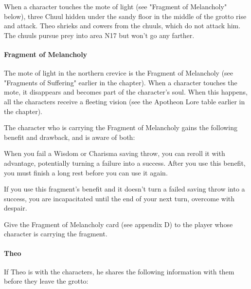 \documentclass[10pt,a4paper,twoside,bg=print,twocolumn,openany,nodeprecatedcode]{dndbook}
\begin{document}
When a character touches the mote of light (see "Fragment of Melancholy" below), three Chuul hidden under the sandy floor in the middle of the grotto rise and attack. Theo shrieks and cowers from the chuuls, which do not attack him. The chuuls pursue prey into area N17 but won't go any farther.

\paragraph{Fragment of Melancholy}
The mote of light in the northern crevice is the Fragment of Melancholy (see "Fragments of Suffering" earlier in the chapter). When a character touches the mote, it disappears and becomes part of the character's soul. When this happens, all the characters receive a fleeting vision (see the Apotheon Lore table earlier in the chapter).

The character who is carrying the Fragment of Melancholy gains the following benefit and drawback, and is aware of both:

\begin{DndComment}{}

\begin{description}[nolistsep]
\item[Benefit.]
When you fail a Wisdom or Charisma saving throw, you can reroll it with advantage, potentially turning a failure into a success. After you use this benefit, you must finish a long rest before you can use it again.
\item[Drawback.]
If you use this fragment's benefit and it doesn't turn a failed saving throw into a success, you are incapacitated until the end of your next turn, overcome with despair.
\end{description}



\end{DndComment}

Give the Fragment of Melancholy card (see appendix D) to the player whose character is carrying the fragment.

\paragraph{Theo}
If Theo is with the characters, he shares the following information with them before they leave the grotto:
\end{document}
